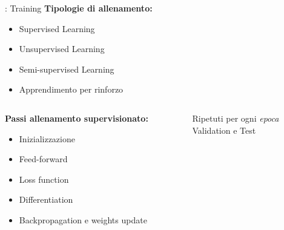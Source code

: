 \documentclass[xcolor=x11names,compress, 
					handout %
]{beamer}
\theoremstyle{definition} \newtheorem{esempio}{Esempio}
\theoremstyle{definition}
\begin{document}
		\begin{frame}{\subsecname: Training}
				\textbf{Tipologie di allenamento:}
				\begin{itemize}
					\item Supervised Learning\pause
					\item Unsupervised Learning\pause
					\item Semi-supervised Learning\pause
					\item Apprendimento per rinforzo
				\end{itemize}\pause
			\begin{columns}
				\begin{column}{0.7\textwidth}
					\textbf{Passi allenamento supervisionato:}
					\begin{itemize}
						\item Inizializzazione 
						\item Feed-forward
						\item Loss function
						\item Differentiation
						\item Backpropagation e weights update
					\end{itemize}\pause
				\end{column}
				\begin{column}{0.3\textwidth}
					\begin{center}
						Ripetuti per ogni \textit{epoca}\\
						Validation e Test
					\end{center}
				\end{column}
			\end{columns}
		\end{frame}
	
\end{document}
